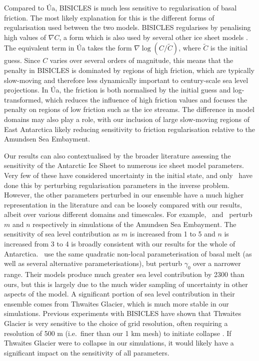 \documentclass[journal abbreviation, manuscript]{copernicus}
\begin{document}
Compared to Úa, BISICLES is much less sensitive to regularisation of basal friction. The most likely explanation for this is the different forms of regularisation used between the two models. BISICLES regularises by penalising high values of $\nabla C$, a form which is also used by several other ice sheet models \citep{morlighemInversionBasalFriction2013,gagliardiniCapabilitiesPerformanceElmer2013,hoffmanMPASAlbanyLandIce2018}. The equivalent term in Úa takes the form $\nabla \log ( C / \tilde{C} )$, where $\tilde{C}$ is the initial guess. Since $C$ varies over several orders of magnitude, this means that the penalty in BISICLES is dominated by regions of high friction, which are typically slow-moving and therefore less dynamically important to century-scale sea level projections. In Úa, the friction is both normalised by the initial guess and log-transformed, which reduces the influence of high friction values and focuses the penalty on regions of low friction such as the ice streams. The difference in model domains may also play a role, with our inclusion of large slow-moving regions of East Antarctica likely reducing sensitivity to friction regularisation relative to the Amundsen Sea Embayment.

Our results can also contextualised by the broader literature assessing the sensitivity of the Antarctic Ice Sheet to numerous ice sheet model parameters. Very few of these have considered uncertainty in the initial state, and only~\cite{rosierCalibratedSeaLevel2025} have done this by perturbing regularisation parameters in the inverse problem. However, the other parameters perturbed in our ensemble have a much higher representation in the literature and can be loosely compared with our results, albeit over various different domains and timescales. For example,~\cite{barnesPredictivePowerIce2022} and~\cite{getraerIncreasingGlenNye2025} perturb $m$ and $n$ respectively in simulations of the Amundsen Sea Embayment. The sensitivity of sea level contribution as $m$ is increased from 1 to 5 and $n$ is increased from 3 to 4 is broadly consistent with our results for the whole of Antarctica.~\cite{coulonShorttermUncertaintiesLongterm2025} use the same quadratic non-local parameterisation of basal melt (as well as several alternative parameterisations), but perturb $\gamma_0$ over a narrower range. Their models produce much greater sea level contribution by 2300 than ours, but this is largely due to the much wider sampling of uncertainty in other aspects of the model. A significant portion of sea level contribution in their ensemble comes from Thwaites Glacier, which is much more stable in our simulations. Previous experiments with BISICLES have shown that Thwaites Glacier is very sensitive to the choice of grid resolution, often requiring a resolution of 500 m (i.e.~finer than our 1 km mesh) to initiate collapse \citep{cornfordAdaptiveMeshRefinement2016}. If Thwaites Glacier were to collapse in our simulations, it would likely have a significant impact on the sensitivity of all parameters.
\end{document}
